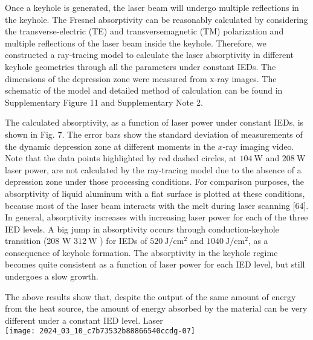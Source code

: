 \documentclass[10pt]{article}
\begin{document}
Once a keyhole is generated, the laser beam will undergo multiple reflections in the keyhole. The Fresnel absorptivity can be reasonably calculated by considering the transverse-electric (TE) and transversemagnetic (TM) polarization and multiple reflections of the laser beam inside the keyhole. Therefore, we constructed a ray-tracing model to calculate the laser absorptivity in different keyhole geometries through all the parameters under constant IEDs. The dimensions of the depression zone were measured from $\mathrm{x}$-ray images. The schematic of the model and detailed method of calculation can be found in Supplementary Figure 11 and Supplementary Note 2.

The calculated absorptivity, as a function of laser power under constant IEDs, is shown in Fig. 7. The error bars show the standard deviation of measurements of the dynamic depression zone at different moments in the $x$-ray imaging video. Note that the data points highlighted by red dashed circles, at $104 \mathrm{~W}$ and $208 \mathrm{~W}$ laser power, are not calculated by the ray-tracing model due to the absence of a depression zone under those processing conditions. For comparison purposes, the absorptivity of liquid aluminum with a flat surface is plotted at these conditions, because most of the laser beam interacts with the melt during laser scanning [64]. In general, absorptivity increases with increasing laser power for each of the three IED levels. A big jump in absorptivity occurs through conduction-keyhole transition (208 W $312 \mathrm{~W}$ ) for IEDs of $520 \mathrm{~J} / \mathrm{cm}^{2}$ and $1040 \mathrm{~J} / \mathrm{cm}^{2}$, as a consequence of keyhole formation. The absorptivity in the keyhole regime becomes quite consistent as a function of laser power for each IED level, but still undergoes a slow growth.

The above results show that, despite the output of the same amount of energy from the heat source, the amount of energy absorbed by the material can be very different under a constant IED level. Laser\\
\texttt{[image: 2024\_03\_10\_c7b73532b88866540ccdg-07]}
\end{document}

